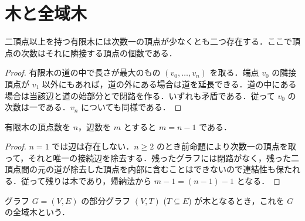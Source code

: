 \section{木と全域木}
\begin{prop}[木の葉の存在]
二頂点以上を持つ有限木には次数一の頂点が少なくとも二つ存在する．ここで頂点の次数はそれに隣接する頂点の個数である．
\end{prop}
\begin{proof}
有限木の道の中で長さが最大のもの $(v_0,\ldots,v_n)$ を取る．端点 $v_0$ の隣接頂点が $v_1$ 以外にもあれば，道の外にある場合は道を延長できる．道の中にある場合は当該辺と道の始部分とで閉路を作る．いずれも矛盾である．従って $v_0$ の次数は一である．$v_n$ についても同様である．
\end{proof}
\begin{prop}[有限木の辺数]
有限木の頂点数を $n$，辺数を $m$ とすると $m=n-1$ である．
\end{prop}
\begin{proof}
$n=1$ では辺は存在しない．$n\geq2$ のとき前命題により次数一の頂点を取って，それと唯一の接続辺を除去する．残ったグラフには閉路がなく，残った二頂点間の元の道が除去した頂点を内部に含むことはできないので連結性も保たれる．従って残りは木であり，帰納法から $m-1=(n-1)-1$ となる．
\end{proof}
\begin{defn}[全域木]
グラフ $G=(V,E)$ の部分グラフ $(V,T)$ ($T\subseteq E$) が木となるとき，これを $G$ の全域木という．
\end{defn}
